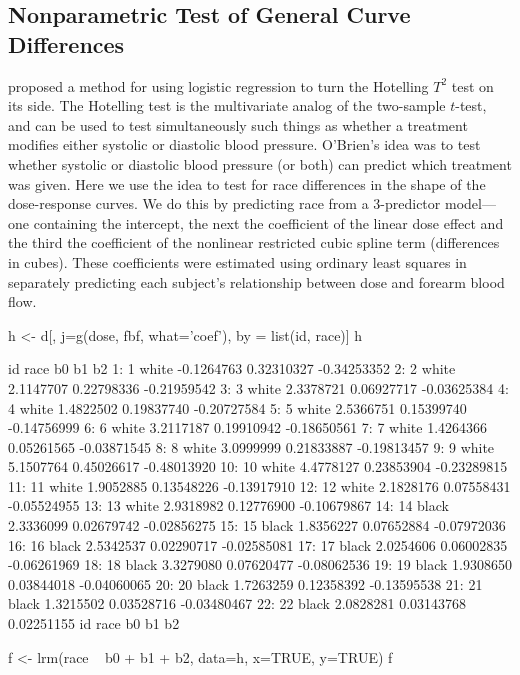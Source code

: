 \subsection{Nonparametric Test of General Curve Differences}\ipacue
\citet{obr88com} proposed a method for using logistic regression to
turn the Hotelling $T^2$ test on its side.  The Hotelling test is the
multivariate analog of the two-sample $t$-test, and can be used to
test simultaneously such things as whether a treatment modifies either
systolic or diastolic blood pressure.  O'Brien's idea was to test
whether systolic or diastolic blood pressure (or both) can predict
which treatment was given.  Here we use the idea to test for race
differences in the shape of the dose-response curves.  We do this by
predicting race from a 3-predictor model---one containing the intercept, the next the coefficient of the linear dose effect and the third the coefficient of the nonlinear restricted cubic spline term (differences in cubes).
These coefficients were estimated
using ordinary least squares in separately predicting each subject's relationship
between dose and forearm blood flow.
\begin{Schunk}
\begin{Sinput}
h <- d[, j=g(dose, fbf, what='coef'), by = list(id, race)]
h
\end{Sinput}
\begin{Soutput}
    id  race         b0         b1          b2
 1:  1 white -0.1264763 0.32310327 -0.34253352
 2:  2 white  2.1147707 0.22798336 -0.21959542
 3:  3 white  2.3378721 0.06927717 -0.03625384
 4:  4 white  1.4822502 0.19837740 -0.20727584
 5:  5 white  2.5366751 0.15399740 -0.14756999
 6:  6 white  3.2117187 0.19910942 -0.18650561
 7:  7 white  1.4264366 0.05261565 -0.03871545
 8:  8 white  3.0999999 0.21833887 -0.19813457
 9:  9 white  5.1507764 0.45026617 -0.48013920
10: 10 white  4.4778127 0.23853904 -0.23289815
11: 11 white  1.9052885 0.13548226 -0.13917910
12: 12 white  2.1828176 0.07558431 -0.05524955
13: 13 white  2.9318982 0.12776900 -0.10679867
14: 14 black  2.3336099 0.02679742 -0.02856275
15: 15 black  1.8356227 0.07652884 -0.07972036
16: 16 black  2.5342537 0.02290717 -0.02585081
17: 17 black  2.0254606 0.06002835 -0.06261969
18: 18 black  3.3279080 0.07620477 -0.08062536
19: 19 black  1.9308650 0.03844018 -0.04060065
20: 20 black  1.7263259 0.12358392 -0.13595538
21: 21 black  1.3215502 0.03528716 -0.03480467
22: 22 black  2.0828281 0.03143768  0.02251155
    id  race         b0         b1          b2
\end{Soutput}
\end{Schunk}
\begin{Sinput}
f <- lrm(race ~ b0 + b1 + b2, data=h, x=TRUE, y=TRUE)
f
\end{Sinput}

